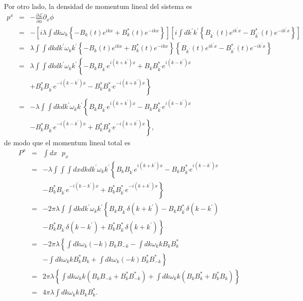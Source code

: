 Por otro lado, la densidad de momentum lineal del sistema es
\begin{eqnarray}
p^{x}&=&-\frac{\partial\mathcal{L}}{\partial\dot{\phi}}\partial_{x}\phi\\
&=&-\left[  i\lambda\int dk\omega_k\left\{  -B_k\left(  t\right)
e^{ikx}+B_k^{\ast}\left(  t\right)  e^{-ikx}\right\}  \right]  \left[  i\int
dk^{\prime}k^{\prime}\left\{  B_{k^{\prime}}\left(  t\right)
e^{ik^{\prime}x}-B_{k^{\prime}}^{\ast}\left(  t\right)
e^{-ik^{\prime}x}\right\}  \right]\\
&=&\lambda\int\int dkdk^{\prime}\omega_kk^{\prime}\left\{  -B_k\left(t\right)
e^{ikx}+B_k^{\ast}\left(  t\right)  e^{-ikx}\right\}
\left\{B_{k^{\prime}}\left(  t\right)
e^{ik^{\prime}x}-B_{k^{\prime}}^{\ast}\left(
t\right)  e^{-ik^{\prime}x}\right\} \\
&=&\lambda\int\int dkdk^{\prime}\omega_kk^{\prime}\left\{
-B_kB_{k^{\prime}}e^{i\left(  k+k^{\prime}\right)
x}+B_kB_{k^{\prime}}^{\ast}e^{i\left(  k-k^{\prime}\right)  x}\right. \\
&&\left.  +B_k^{\ast}B_{k^{\prime}}e^{-i\left(  k-k^{\prime}\right)
x}-B_k^{\ast}B_{k^{\prime}}^{\ast}e^{-i\left(  k+k^{\prime}\right)  x}\right\}\\
&=&-\lambda\int\int dkdk^{\prime}\omega_kk^{\prime}\left\{
B_kB_{k^{\prime}}e^{i\left(  k+k^{\prime}\right)
x}-B_kB_{k^{\prime}}^{\ast}e^{i\left(k-k^{\prime}\right)  x}\right. \\
&&\left.  -B_k^{\ast}B_{k^{\prime}}e^{-i\left(  k-k^{\prime}\right)
x}+B_k^{\ast}B_{k^{\prime}}^{\ast}e^{-i\left(  k+k^{\prime}\right)x}\right\}  ,
\end{eqnarray}
de modo que el momentum lineal total es
\begin{eqnarray}
P^{x}&=&\int dx\text{ }p_{x}\\
&=&-\lambda\int\int\int
dxdkdk^{\prime}\omega_kk^{\prime}\left\{B_kB_{k^{\prime}}e^{i\left(
k+k^{\prime}\right)  x}-B_kB_{k^{\prime}}^{\ast}e^{i\left(  k-k^{\prime}\right)
x}\right.\nonumber\\
&&\left.-B_k^{\ast}B_{k^{\prime}}e^{-i\left(  k-k^{\prime}\right)
x}+B_k^{\ast}B_{k^{\prime}}^{\ast
}e^{-i\left(  k+k^{\prime}\right)  x}\right\} \\
&=&-2\pi\lambda\int\int dkdk^{\prime}\omega_kk^{\prime}\left\{
B_kB_{k^{\prime}}\delta\left( k+k^{\prime}\right)
-B_kB_{k^{\prime}}^{\ast}\delta\left(  k-k^{\prime}\right)\right.\nonumber\\
&&\left.-B_k^{\ast}B_{k^{\prime}}\delta\left(k-k^{\prime}\right)
+B_k^{\ast}B_{k^{\prime}}^{\ast}\delta\left(k+k^{\prime}\right)  \right\} \\
&=&-2\pi\lambda\left\{  \int dk\omega_k\left(  -k\right)  B_kB_{-k}-\int
dk\omega_kkB_kB_k^{\ast}\right. \\
&&\left.  -\int dk\omega_kkB_k^{\ast}B_k+\int dk\omega_k\left(-k\right)
B_k^{\ast}B_{-k}^{\ast}\right\} \\
&=&2\pi\lambda\left\{  \int dk\omega_kk\left(
B_kB_{-k}+B_k^{\ast}B_{-k}^{\ast}\right)  +\int dk\omega_kk\left(
B_kB_k^{\ast}+B_k^{\ast}B_k\right)  \right\}\\
&=&4\pi\lambda\int dk\omega_kkB_kB_k^{\ast}.
\end{eqnarray}

